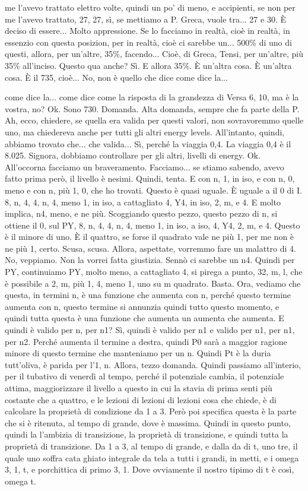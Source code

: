 \begin{soluzione}
{me l'avevo trattato elettro volte, quindi un po' di meno, e accipienti, se non per me l'avevo trattato, 27, 27, sì, se mettiamo a P. Greca, vuole tra... 27 e 30. È deciso di essere... Molto appressione. Se lo facciamo in realtà, cioè in realtà, in essenzio con questa posizion, per in realtà, cioè ci sarebbe un... 500\% di uno di questi, allora, per un'altre, 35\%, facendo... Cioè, di Greca, Tensi, per un'altre, più 35\% all'inciso. Questo qua anche? Sì. E allora 35\%. È un'altra cosa. È un'altra cosa. È il 735, cioè... No, non è quello che dice come dice la... 
   
   come dice la... come dice come la risposta di la grandezza di Versa 6, 10, ma è la vostra, no? Ok. Sono 730. Domanda. Alta domanda, sempre che fa parte della P. Ah, ecco, chiedere, se quella era valida per questi valori, non sovravoremmo quelle uno, ma chiedereva anche per tutti gli altri energy levels. All'intanto, quindi, abbiamo trovato che... che valida... Sì, perché la viaggia 0,4. La viaggia 0,4 è il 8.025. Signora, dobbiamo controllare per gli altri, livelli di energy. Ok. All'occorna facciamo un braveramento. Facciamo... se stiamo sabendo, avevo fatto prima però, il livello è nesimi. Quindi, tenta. E con n, 1, in iso, e con n, 0, meno e con n, più 1, 0, che ho trovati. Questo è quasi uguale. È uguale a il 0 di I. 8, n, 4, 4, n, 4, meno 1, in iso, a cattagliato 4, Y4, in iso, 2, m, e 4. E molto implica, n4, meno, e ne più. Scoggiando questo pezzo, questo pezzo di n, si ottiene il 0, sul PY, 8, n, 4, 4, n, 4, meno 1, in iso, a iso, 4, Y4, 2, m, e 4. Questo è il minore di uno. È il quattro, se forse il quadrato vale ne più 1, per me non è ne più 1, certo. Scusa, scusa. Allora, aspettate, vorremmo fare un malattro di 4. No, veppiamo. Non la vorrei fatta giustizia. Sennò ci sarebbe un n4. Quindi per PY, continuiamo PY, molto meno, a cattagliato 4, si pirega a punto, 32, m, l, che è possibile a 2, m, più 1, 4, meno 1, uno su m quadrato. Basta. Ora, vediamo che questa, in termini n, è una funzione che aumenta con n, perché questo termine aumenta con n, questo termine si annunzia quindi tutto questo momento, e quindi tutta questa è una funzione che aumenta un aumenta che aumenta. E quindi è valido per n, per n1? Sì, quindi è valido per n1 e valido per n1, per n1, per n2. Perché aumenta il termine a destra, quindi P0 sarà a maggior ragione minore di questo termine che manteniamo per un n. Quindi Pt è la duria tutt'oliva, è parida per l'1, n. Allora, tezzo domanda. Quindi passiamo all'interio, per il tubativo di venerdì al tempo, perché il potenziale cambia, il potenziale attima, maggiorizzare il livello a questo in cui la stavia di prima senti più costante che a quattro, e le lezioni di lezioni di lezioni cosa che chiede, è di calcolare la proprietà di condizione da 1 a 3. Però poi specifica questa è la parte che si è ritenuta, al tempo di grande, dove è massima. Quindi in questo punto, quindi la l'ambizia di transizione, la proprietà di transizione, e quindi tutta la proprietà di transizione. Da 1 a 3, al tempo di grande, e dalla da di t, uno tre, il quale uno soffra cata ghiato integrale da tela a tutti i grandi, in metti, e i omega 3, 1, t, e porchittica di primo 3, 1. Dove ovviamente il nostro tipimo di t è così, omega t. }
\end{soluzione}
